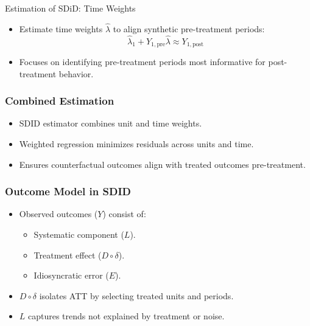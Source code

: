 \documentclass{beamer}
\begin{document}
\begin{frame}{Estimation of SDiD: Time Weights}

\begin{itemize}
    \item Estimate time weights \(\widehat{\lambda}\) to align synthetic pre-treatment periods:
    \[
    \widehat{\lambda}_1 + Y_{1,\text{pre}} \widehat{\lambda} \approx Y_{1,\text{post}}
    \]
    \item Focuses on identifying pre-treatment periods most informative for post-treatment behavior.
\end{itemize}

\end{frame}



\begin{frame}
\frametitle{Combined Estimation}

\begin{itemize}
    \item SDID estimator combines unit and time weights.
    \item Weighted regression minimizes residuals across units and time.
    \item Ensures counterfactual outcomes align with treated outcomes pre-treatment.
\end{itemize}

\end{frame}




\begin{frame}
\frametitle{Outcome Model in SDID}

\begin{itemize}
    \item Observed outcomes (\(Y\)) consist of:
        \begin{itemize}
            \item Systematic component (\(L\)).
            \item Treatment effect (\(D \circ \delta\)).
            \item Idiosyncratic error (\(E\)).
        \end{itemize}
    \item \(D \circ \delta\) isolates ATT by selecting treated units and periods.
    \item \(L\) captures trends not explained by treatment or noise.
\end{itemize}

\end{frame}
\end{document}
